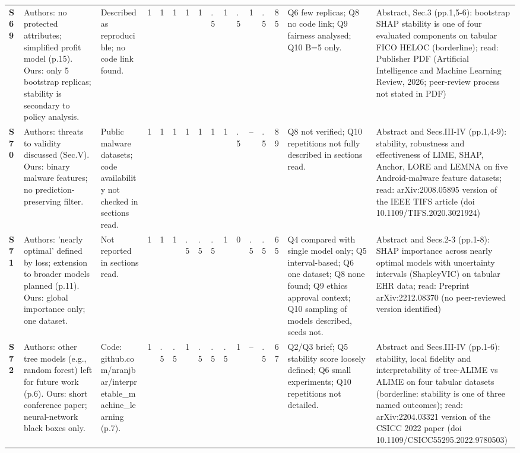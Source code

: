 \begin{longtable}{@{}P{1.0cm}P{4.6cm}P{3.6cm}P{0.3cm}P{0.3cm}P{0.3cm}P{0.3cm}P{0.3cm}P{0.3cm}P{0.3cm}P{0.3cm}P{0.3cm}P{0.36cm}P{0.75cm}P{3.0cm}P{3.9cm}@{}}
\textbf{S69} & Authors: no protected attributes; simplified profit model (p.15). Ours: only 5 bootstrap replicas; stability is secondary to policy analysis. & Described as reproducible; no code link found. & 1 & 1 & 1 & 1 & 1 & .5 & 1 & .5 & 1 & .5 & 85 & Q6 few replicas; Q8 no code link; Q9 fairness analysed; Q10 B=5 only. & Abstract, Sec.3 (pp.1,5-6): bootstrap SHAP stability is one of four evaluated components on tabular FICO HELOC (borderline); read: Publisher PDF (Artificial Intelligence and Machine Learning Review, 2026; peer-review process not stated in PDF) \\
\textbf{S70} & Authors: threats to validity discussed (Sec.V). Ours: binary malware features; no prediction-preserving filter. & Public malware datasets; code availability not checked in sections read. & 1 & 1 & 1 & 1 & 1 & 1 & 1 & .5 & -- & .5 & 89 & Q8 not verified; Q10 repetitions not fully described in sections read. & Abstract and Secs.III-IV (pp.1,4-9): stability, robustness and effectiveness of LIME, SHAP, Anchor, LORE and LEMNA on five Android-malware feature datasets; read: arXiv:2008.05895 version of the IEEE TIFS article (doi 10.1109/\allowbreak{}TIFS.2020.3021924) \\
\textbf{S71} & Authors: 'nearly optimal' defined by loss; extension to broader models planned (p.11). Ours: global importance only; one dataset. & Not reported in sections read. & 1 & 1 & 1 & .5 & .5 & .5 & 1 & 0 & .5 & .5 & 65 & Q4 compared with single model only; Q5 interval-based; Q6 one dataset; Q8 none found; Q9 ethics approval context; Q10 sampling of models described, seeds not. & Abstract and Secs.2-3 (pp.1-8): SHAP importance across nearly optimal models with uncertainty intervals (ShapleyVIC) on tabular EHR data; read: Preprint arXiv:2212.08370 (no peer-reviewed version identified) \\
\textbf{S72} & Authors: other tree models (e.g., random forest) left for future work (p.6). Ours: short conference paper; neural-network black boxes only. & Code: github.com/\allowbreak{}nranjbar/\allowbreak{}interpretable\_\allowbreak{}machine\_\allowbreak{}learning (p.7). & 1 & .5 & .5 & 1 & .5 & .5 & .5 & 1 & -- & .5 & 67 & Q2/\allowbreak{}Q3 brief; Q5 stability score loosely defined; Q6 small experiments; Q10 repetitions not detailed. & Abstract and Secs.III-IV (pp.1-6): stability, local fidelity and interpretability of tree-ALIME vs ALIME on four tabular datasets (borderline: stability is one of three named outcomes); read: arXiv:2204.03321 version of the CSICC 2022 paper (doi 10.1109/\allowbreak{}CSICC55295.2022.9780503) \\

\end{longtable}
